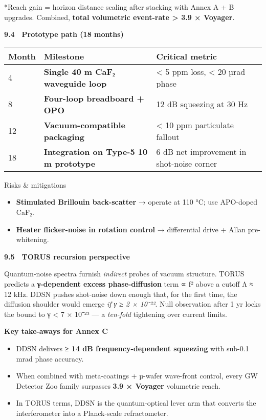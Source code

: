 \documentclass[]{article}
\begin{document}
*Reach gain = horizon distance scaling after stacking with Annex A + B
upgrades. Combined, \textbf{total volumetric event-rate \textgreater{}
3.9 × Voyager}.

\textbf{9.4 Prototype path (18 months)}

\begin{longtable}[]{@{}lll@{}}
\toprule
\textbf{Month} & \textbf{Milestone} & \textbf{Critical
metric}\tabularnewline
\midrule
\endhead
4 & \textbf{Single 40 m CaF₂ waveguide loop} & \textless{} 5 ppm loss,
\textless{} 20 µrad phase\tabularnewline
8 & \textbf{Four-loop breadboard + OPO} & 12 dB squeezing at 30
Hz\tabularnewline
12 & \textbf{Vacuum-compatible packaging} & \textless{} 10 ppm
particulate fallout\tabularnewline
18 & \textbf{Integration on Type-5 10 m prototype} & 6 dB net
improvement in shot-noise corner\tabularnewline
\bottomrule
\end{longtable}

Risks \& mitigations

\begin{itemize}
\item
  \textbf{Stimulated Brillouin back-scatter} → operate at 110 °C; use
  APO-doped CaF₂.
\item
  \textbf{Heater flicker-noise in rotation control} → differential drive
  + Allan pre-whitening.
\end{itemize}

\textbf{9.5 TORUS recursion perspective}

Quantum-noise spectra furnish \emph{indirect} probes of vacuum
structure. TORUS predicts a \textbf{γ-dependent excess phase-diffusion}
term ∝ f² above a cutoff Λ ≈ 12 kHz. DDSN pushes shot-noise down enough
that, for the first time, the diffusion shoulder would emerge \emph{if γ
≥ 2 × 10⁻²²}. Null observation after 1 yr locks the bound to γ
\textless{} 7 × 10⁻²³ --- a \emph{ten-fold} tightening over current
limits.

\textbf{Key take-aways for Annex C}

\begin{itemize}
\item
  DDSN delivers \textbf{≥ 14 dB frequency-dependent squeezing} with
  sub-0.1 mrad phase accuracy.
\item
  When combined with meta-coatings + µ-wafer wave-front control, every
  GW Detector Zoo family surpasses \textbf{3.9 × Voyager} volumetric
  reach.
\item
  In TORUS terms, DDSN is the quantum-optical lever arm that converts
  the interferometer into a Planck-scale refractometer.
\end{itemize}
\end{document}

